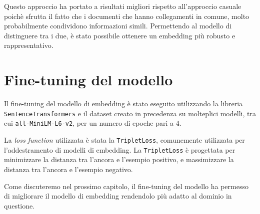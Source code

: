 Questo approccio ha portato a risultati migliori rispetto
all'approccio casuale poichè sfrutta il fatto che i
documenti che hanno collegamenti in comune, molto
probabilmente condividono informazioni simili.
Permettendo al modello di distinguere tra i due, è stato
possibile ottenere un embedding più robusto e
rappresentativo.

\section{Fine-tuning del modello}
\label{sec:fine_tuning}
Il fine-tuning del modello di embedding è stato eseguito
utilizzando la libreria \texttt{SentenceTransformers} e il
dataset creato in precedenza su molteplici modelli, tra cui
\texttt{all-MiniLM-L6-v2}, per un numero di epoche pari a
4.

La \textit{loss function} utilizzata è stata la
\texttt{TripletLoss}\cite{hermans2017defense}, comunemente
utilizzata per l'addestramento di modelli di embedding.
La \texttt{TripletLoss} è progettata per minimizzare la
distanza tra l'ancora e l'esempio positivo, e massimizzare
la distanza tra l'ancora e l'esempio negativo.

Come discuteremo nel prossimo capitolo, il fine-tuning del
modello ha permesso di migliorare il modello di embedding
rendendolo più adatto al dominio in questione.
